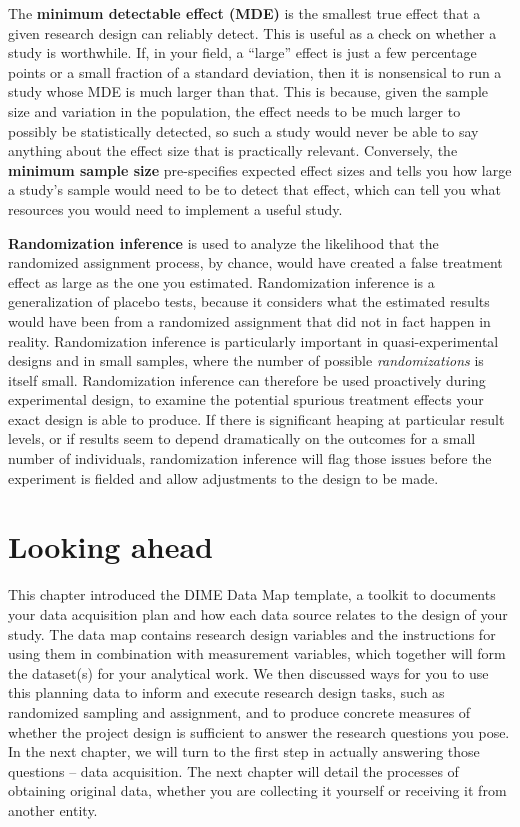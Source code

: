 The \textbf{minimum detectable effect (MDE)}
is the smallest true effect that a given research design can reliably detect.
This is useful as a check on whether a study is worthwhile.
If, in your field, a ``large'' effect is just a few percentage points
or a small fraction of a standard deviation,
then it is nonsensical to run a study whose MDE is much larger than that.
This is because, given the sample size and variation in the population,
the effect needs to be much larger to possibly be statistically detected,
so such a study would never be able to say anything about the effect size that is practically relevant.
Conversely, the \textbf{minimum sample size} pre-specifies expected effect sizes
and tells you how large a study's sample would need to be to detect that effect,
which can tell you what resources you would need
to implement a useful study.

\textbf{Randomization inference}
is used to analyze the likelihood
that the randomized assignment process, by chance,
would have created a false treatment effect as large as the one you estimated.
Randomization inference is a generalization of placebo tests,
because it considers what the estimated results would have been
from a randomized assignment that did not in fact happen in reality.
Randomization inference is particularly important
in quasi-experimental designs and in small samples,
where the number of possible \textit{randomizations} is itself small.
Randomization inference can therefore be used proactively during experimental design,
to examine the potential spurious treatment effects your exact design is able to produce.
If there is significant heaping at particular result levels,
or if results seem to depend dramatically on the outcomes for a small number of individuals,
randomization inference will flag those issues before the experiment is fielded
and allow adjustments to the design to be made.

\section{Looking ahead}
This chapter introduced the DIME Data Map template,
a toolkit to documents your data acquisition plan and
how each data source relates to the design of your study.
The data map contains research design variables and the instructions
for using them in combination with measurement variables, which together
will form the dataset(s) for your analytical work.
We then discussed ways for you to use this planning data
to inform and execute research design tasks,
such as randomized sampling and assignment,
and to produce concrete measures
of whether the project design is sufficient to answer the research questions you pose.
In the next chapter,
we will turn to the first step in actually answering those questions --
data acquisition.
The next chapter will detail the processes of obtaining
original data,
whether you are collecting it yourself or
receiving it from another entity.
